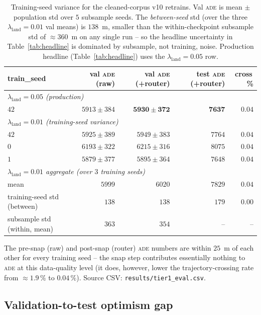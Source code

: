 \documentclass[oneside, a4paper, onecolumn, 11pt]{article}
\newcommand{\ade}{\textsc{ade}}
\begin{document}
\begin{table}[h]
\centering
\caption{Training-seed variance for the cleaned-corpus v10 retrains.
Val \ade{} is mean $\pm$ population std over $5$ subsample seeds.
The \emph{between-seed} std (over the three $\lambda_{\mathrm{land}}=0.01$
val means) is $138$~m, smaller than the within-checkpoint subsample
std of $\approx 360$~m on any single run -- so the headline
uncertainty in Table~\ref{tab:headline} is dominated by subsample,
not training, noise.  Production headline (Table~\ref{tab:headline})
uses the $\lambda_{\mathrm{land}}=0.05$ row.}
\label{tab:trainseed}
\begin{tabular}{lrrrr}
\toprule
\textbf{train\_seed} & val \ade{} (raw) & val \ade{} (+router) & test \ade{} (+router) & cross\,\% \\
\midrule
\multicolumn{5}{l}{\emph{$\lambda_{\mathrm{land}} = 0.05$ (production)}} \\
$42$ & $5913 \pm 384$ & $\mathbf{5930 \pm 372}$ & $\mathbf{7637}$ & $\mathbf{0.04}$ \\
\midrule
\multicolumn{5}{l}{\emph{$\lambda_{\mathrm{land}} = 0.01$ (training-seed variance)}} \\
$42$ & $5925 \pm 389$ & $5949 \pm 383$ & $7764$ & $0.04$ \\
$0$  & $6193 \pm 322$ & $6215 \pm 316$ & $8075$ & $0.04$ \\
$1$  & $5879 \pm 377$ & $5895 \pm 364$ & $7648$ & $0.04$ \\
\midrule
\multicolumn{5}{l}{\emph{$\lambda_{\mathrm{land}} = 0.01$ aggregate (over $3$ training seeds)}} \\
mean         & $5999$ & $6020$ & $7829$ & $0.04$ \\
training-seed std (between)  & $138$  & $138$ & $179$ & $0.00$ \\
subsample std (within, mean) & $363$  & $354$ & --    & --   \\
\bottomrule
\end{tabular}
\end{table}

The pre-snap (raw) and post-snap (router) \ade{} numbers are within
$25$~m of each other for every training seed -- the snap step
contributes essentially nothing to \ade{} at this data-quality level
(it does, however, lower the trajectory-crossing rate from
$\approx 1.9\,\%$ to $0.04\,\%$). Source CSV:
\texttt{results/tier1\_eval.csv}.

\subsection{Validation-to-test optimism gap}\label{sec:valtest}
\end{document}
